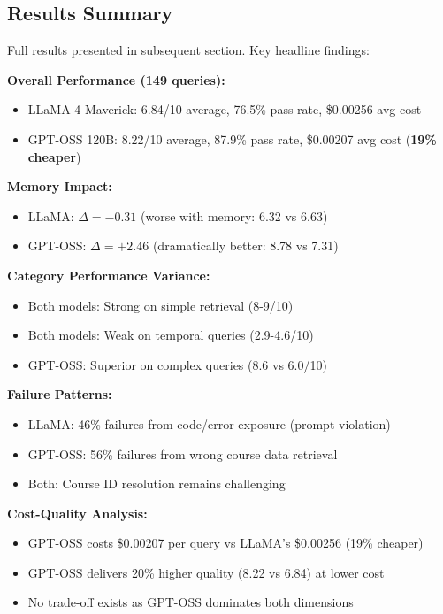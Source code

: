 \documentclass{article}
\begin{document}
\subsection{Results Summary}

Full results presented in subsequent section. Key headline findings:

\textbf{Overall Performance (149 queries):}
\begin{itemize}
    \item LLaMA 4 Maverick: 6.84/10 average, 76.5\% pass rate, \$0.00256 avg cost
    \item GPT-OSS 120B: 8.22/10 average, 87.9\% pass rate, \$0.00207 avg cost (\textbf{19\% cheaper})
\end{itemize}

\textbf{Memory Impact:}
\begin{itemize}
    \item LLaMA: $\Delta = -0.31$ (worse with memory: 6.32 vs 6.63)
    \item GPT-OSS: $\Delta = +2.46$ (dramatically better: 8.78 vs 7.31)
\end{itemize}

\textbf{Category Performance Variance:}
\begin{itemize}
    \item Both models: Strong on simple retrieval (8-9/10)
    \item Both models: Weak on temporal queries (2.9-4.6/10)
    \item GPT-OSS: Superior on complex queries (8.6 vs 6.0/10)
\end{itemize}

\textbf{Failure Patterns:}
\begin{itemize}
    \item LLaMA: 46\% failures from code/error exposure (prompt violation)
    \item GPT-OSS: 56\% failures from wrong course data retrieval
    \item Both: Course ID resolution remains challenging
\end{itemize}

\textbf{Cost-Quality Analysis:}
\begin{itemize}
    \item GPT-OSS costs \$0.00207 per query vs LLaMA's \$0.00256 (19\% cheaper)
    \item GPT-OSS delivers 20\% higher quality (8.22 vs 6.84) at lower cost
    \item No trade-off exists as GPT-OSS dominates both dimensions
\end{itemize}
\end{document}
